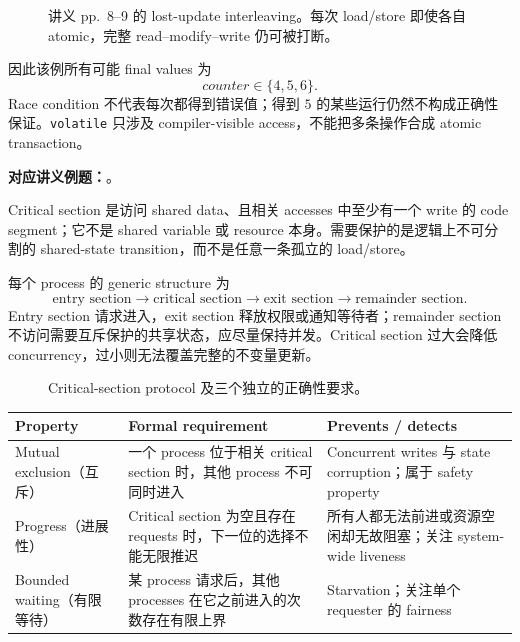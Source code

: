 \begin{figure}[htbp]
  \centering
  \resizebox{0.86\textwidth}{!}{}
  \caption{讲义 pp.~8--9 的 lost-update interleaving。每次 load/store 即使各自 atomic，完整 read--modify--write 仍可被打断。}
  \label{fig:sc2005-l07-race}
\end{figure}

因此该例所有可能 final values 为
\[
  \boxed{counter\in\{4,5,6\}}.
\]
Race condition 不代表每次都得到错误值；得到 $5$ 的某些运行仍然不构成正确性保证。\texttt{volatile} 只涉及 compiler-visible access，不能把多条操作合成 atomic transaction。

\textbf{对应讲义例题：}。


Critical section 是访问 shared data、且相关 accesses 中至少有一个 write 的 code segment；它不是 shared variable 或 resource 本身。需要保护的是逻辑上不可分割的 shared-state transition，而不是任意一条孤立的 load/store。

每个 process 的 generic structure 为
\[
  \text{entry section}\rightarrow
  \text{critical section}\rightarrow
  \text{exit section}\rightarrow
  \text{remainder section}.
\]
Entry section 请求进入，exit section 释放权限或通知等待者；remainder section 不访问需要互斥保护的共享状态，应尽量保持并发。Critical section 过大会降低 concurrency，过小则无法覆盖完整的不变量更新。


\begin{figure}[htbp]
  \centering
  \resizebox{0.98\textwidth}{!}{}
  \caption{Critical-section protocol 及三个独立的正确性要求。}
  \label{fig:sc2005-l07-properties}
\end{figure}

\begin{center}
\small
\begin{tabularx}{0.98\textwidth}{@{}>{\raggedright\arraybackslash}p{3.0cm}XX@{}}
  \toprule
  Property & Formal requirement & Prevents / detects \\
  \midrule
  Mutual exclusion（互斥）
    & 一个 process 位于相关 critical section 时，其他 process 不可同时进入
    & Concurrent writes 与 state corruption；属于 safety property \\
  Progress（进展性）
    & Critical section 为空且存在 requests 时，下一位的选择不能无限推迟
    & 所有人都无法前进或资源空闲却无故阻塞；关注 system-wide liveness \\
  Bounded waiting（有限等待）
    & 某 process 请求后，其他 processes 在它之前进入的次数存在有限上界
    & Starvation；关注单个 requester 的 fairness \\
  \bottomrule
\end{tabularx}
\end{center}

